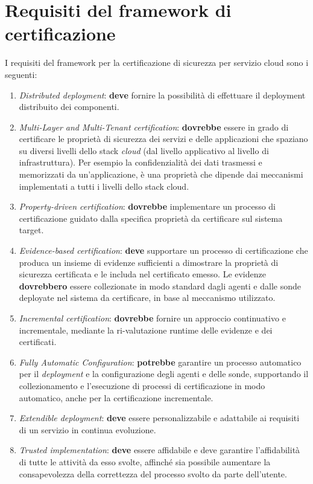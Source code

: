 \documentclass[../main.tex]{subfiles}
\begin{document}
\section{Requisiti del framework di certificazione}

I requisiti del framework per la certificazione di sicurezza per servizio cloud sono i seguenti:\cite{Cloud1}
\begin{enumerate}
\item \textit{Distributed deployment}: \textbf{deve} fornire la possibilità di effettuare il deployment distribuito dei componenti.
\item \textit{Multi-Layer and Multi-Tenant certification}: \textbf{dovrebbe} essere in grado di certificare le  proprietà di sicurezza dei servizi e delle applicazioni che spaziano su diversi livelli dello stack \textit{cloud} (dal livello applicativo al livello di infrastruttura). Per esempio la confidenzialità dei dati trasmessi e memorizzati da un'applicazione,  è una proprietà che dipende dai meccanismi implementati a tutti i livelli dello stack cloud.
\item \textit{Property-driven certification}: \textbf{dovrebbe} implementare un processo di certificazione guidato dalla specifica proprietà da certificare sul sistema target.
\item \textit{Evidence-based certification}: \textbf{deve} supportare un processo di certificazione che produca un insieme di evidenze sufficienti a dimostrare la proprietà di sicurezza certificata e le includa nel certificato emesso. Le evidenze \textbf{dovrebbero} essere collezionate in modo standard dagli agenti e dalle sonde deployate nel sistema da certificare, in base al meccanismo utilizzato.
\item \textit{Incremental certification}: \textbf{dovrebbe} fornire un approccio continuativo e incrementale, mediante la ri-valutazione runtime delle evidenze e dei certificati. 
\item \textit{Fully Automatic Configuration}: \textbf{potrebbe} garantire un processo automatico per il \textit{deployment} e la configurazione degli agenti e delle sonde, supportando il collezionamento e l'esecuzione di processi di certificazione in modo automatico, anche per la certificazione incrementale.
\item \textit{Extendible deployment}: \textbf{deve} essere personalizzabile e adattabile ai requisiti di un servizio in continua evoluzione.
\item \textit{Trusted implementation}: \textbf{deve} essere affidabile e deve garantire l'affidabilità di tutte le attività da esso svolte, affinché sia possibile aumentare la consapevolezza della correttezza del processo svolto da parte dell'utente.
\end{enumerate}
\end{document}
